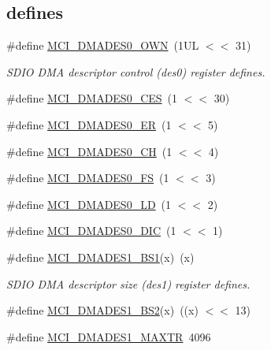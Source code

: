 \subsection*{\textquotesingle{}defines\textquotesingle{}}
\begin{DoxyCompactItemize}
\item 
\#define \hyperlink{group___s_d_i_f__18_x_x__43_x_x_ga9cc0b616dabdfa17ca7704ec10a9a07e}{M\+C\+I\+\_\+\+D\+M\+A\+D\+E\+S0\+\_\+\+O\+WN}~(1\+U\+L $<$$<$ 31)
\begin{DoxyCompactList}\small\item\em S\+D\+IO D\+MA descriptor control (des0) register defines. \end{DoxyCompactList}\item 
\#define \hyperlink{group___s_d_i_f__18_x_x__43_x_x_ga16e7ffceb4d58ef4e433ce058db1d329}{M\+C\+I\+\_\+\+D\+M\+A\+D\+E\+S0\+\_\+\+C\+ES}~(1 $<$$<$ 30)
\item 
\#define \hyperlink{group___s_d_i_f__18_x_x__43_x_x_ga920a3926448243313844e17ebcb0772c}{M\+C\+I\+\_\+\+D\+M\+A\+D\+E\+S0\+\_\+\+ER}~(1 $<$$<$ 5)
\item 
\#define \hyperlink{group___s_d_i_f__18_x_x__43_x_x_ga855ace5f638d58dbf22869f5e426e4a5}{M\+C\+I\+\_\+\+D\+M\+A\+D\+E\+S0\+\_\+\+CH}~(1 $<$$<$ 4)
\item 
\#define \hyperlink{group___s_d_i_f__18_x_x__43_x_x_ga1426783aaf334b21e15bce736b437931}{M\+C\+I\+\_\+\+D\+M\+A\+D\+E\+S0\+\_\+\+FS}~(1 $<$$<$ 3)
\item 
\#define \hyperlink{group___s_d_i_f__18_x_x__43_x_x_gaf8d86743fcf4c31aba0848da452b9b40}{M\+C\+I\+\_\+\+D\+M\+A\+D\+E\+S0\+\_\+\+LD}~(1 $<$$<$ 2)
\item 
\#define \hyperlink{group___s_d_i_f__18_x_x__43_x_x_gad22ff199990d9e28bd0ac6aa6795f21e}{M\+C\+I\+\_\+\+D\+M\+A\+D\+E\+S0\+\_\+\+D\+IC}~(1 $<$$<$ 1)
\item 
\#define \hyperlink{group___s_d_i_f__18_x_x__43_x_x_ga22d324f9117ca732493b9c50e988de37}{M\+C\+I\+\_\+\+D\+M\+A\+D\+E\+S1\+\_\+\+B\+S1}(x)~(x)
\begin{DoxyCompactList}\small\item\em S\+D\+IO D\+MA descriptor size (des1) register defines. \end{DoxyCompactList}\item 
\#define \hyperlink{group___s_d_i_f__18_x_x__43_x_x_ga4062b6adc0b58f501634352fd38760c1}{M\+C\+I\+\_\+\+D\+M\+A\+D\+E\+S1\+\_\+\+B\+S2}(x)~((x) $<$$<$ 13)
\item 
\#define \hyperlink{group___s_d_i_f__18_x_x__43_x_x_gaa57e923a4321476b1b67ecd076e053a7}{M\+C\+I\+\_\+\+D\+M\+A\+D\+E\+S1\+\_\+\+M\+A\+X\+TR}~4096

\end{DoxyCompactItemize}
